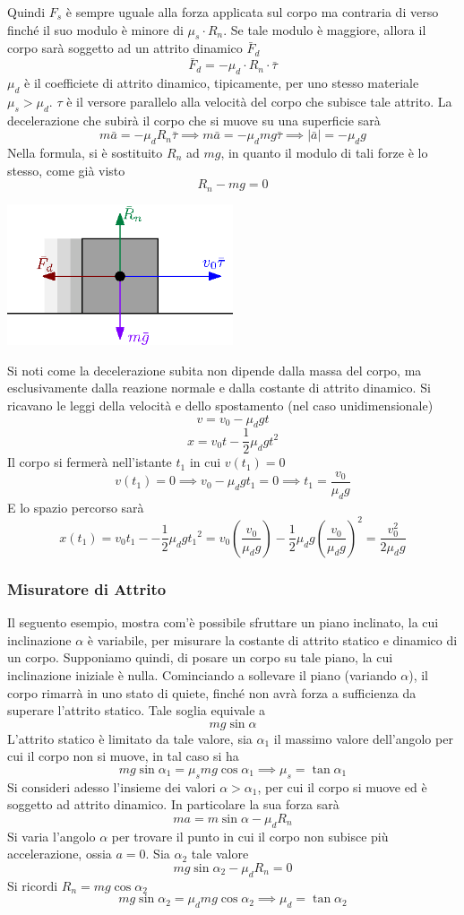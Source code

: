 \documentclass[10pt, letterpaper]{report}
\begin{document}
 Quindi $F_s$ è sempre uguale alla forza applicata sul corpo ma contraria di verso finché il suo modulo è minore 
 di $\mu_s\cdot R_n$. Se tale modulo è maggiore, allora il corpo sarà soggetto ad un 
 attrito dinamico $\bar F_d$
 $$ \bar F_d = -\mu_d\cdot R_n\cdot \bar \tau$$
$\mu_d$ è il coefficiete di attrito dinamico, tipicamente, per uno stesso materiale $\mu_s>\mu_d$. $\tau$ è il 
versore parallelo alla velocità del corpo che subisce tale attrito. La decelerazione che subirà 
il corpo che si muove su una superficie sarà
$$ m\bar a = -\mu_dR_n\bar \tau\implies m\bar a = -\mu_dmg\bar \tau \implies |\bar a| = -\mu_d g$$
Nella formula, si è sostituito $R_n$ ad $mg$, in quanto il modulo di tali forze è lo stesso, come già visto 
$$ R_n-mg=0$$
\begin{center}
    \includegraphics[width=0.5\textwidth]{images/attritoDinamico.eps}
\end{center}
Si noti come la decelerazione subita non dipende dalla massa del corpo, ma esclusivamente dalla reazione 
normale e dalla costante di attrito dinamico. Si ricavano le leggi della velocità e dello spostamento (nel caso 
unidimensionale) 
$$ v=v_0-\mu_dgt$$ 
$$ x=v_0t-\frac{1}{2}\mu_dgt^2$$
Il corpo si fermerà nell'istante $t_1$ in cui $v(t_1)=0$
$$ v(t_1)=0\implies v_0-\mu_dgt_1=0\implies t_1=\frac{v_0}{\mu_dg}$$
E lo spazio percorso sarà 
$$ x(t_1)=v_0t_1--\frac{1}{2}\mu_dg{t_1}^2=
v_0(\frac{v_0}{\mu_dg})-\frac{1}{2}\mu_dg{(\frac{v_0}{\mu_dg})}^2=\frac{v_0^2}{2\mu_dg}
$$
\subsubsection{Misuratore di Attrito}
Il seguento esempio, mostra com'è possibile sfruttare un piano inclinato, la cui inclinazione 
$\alpha$ è variabile, per misurare la costante di attrito statico e dinamico di un corpo. Supponiamo quindi, di posare un 
corpo su tale piano, la cui inclinazione iniziale è nulla. Cominciando a sollevare il piano (variando $\alpha$), il corpo 
rimarrà in uno stato di quiete, finché non avrà forza a sufficienza da superare l'attrito statico. Tale 
soglia equivale a $$mg\sin\alpha $$
L'attrito statico è limitato da tale valore, sia $\alpha_1$ il massimo valore dell'angolo per cui 
il corpo non si muove, in tal caso si ha 
$$ mg\sin\alpha_1=\mu_smg\cos\alpha_1\implies\mu_s=\tan\alpha_1$$
Si consideri adesso l'insieme dei valori $\alpha>\alpha_1$, per cui il corpo si muove ed è soggetto 
ad attrito dinamico. In particolare la sua forza sarà 
$$ma=m\sin\alpha-\mu_dR_n $$
Si varia l'angolo $\alpha$ per trovare il punto in cui il corpo non subisce più accelerazione, ossia $a=0$. Sia 
$\alpha_2$ tale valore 
$$ mg\sin\alpha_2-\mu_dR_n=0$$
Si ricordi $R_n=mg\cos\alpha_2$
$$ mg\sin\alpha_2=\mu_dmg\cos\alpha_2\implies \mu_d=\tan\alpha_2$$
\flowerLine 
\end{document}
